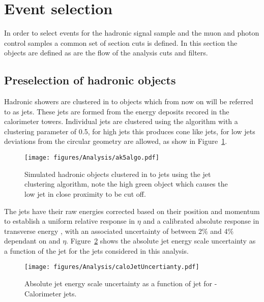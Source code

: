 
\section{Event selection} %
\label{sec:event_selection}
In order to select events for the hadronic signal sample and the muon and 
photon control samples a common set of section cuts is defined. In this section 
the objects are defined as are the flow of the analysis cuts and filters.

\subsection{Preselection of hadronic objects} %
\label{sub:Preselection_of_hadronic_objects}
Hadronic showers are clustered in to objects which from now on will be referred 
to as jets. These jets are formed from the energy deposits recored in the 
calorimeter towers. Individual jets are clustered using the \AK 
algorithm with a clustering parameter of 0.5\cite{Cacciari:2008ua}, for high \PT jets this produces cone like jets, for low \PT jets deviations from the circular geometry are allowed, as show in Figure~\ref{fig:figures_Analysis_ak5algo}.

\begin{figure}[htbp]
  \centering
    \texttt{[image: figures/Analysis/ak5algo.pdf]}
  \caption{Simulated hadronic objects clustered in to jets using the \AK jet 
  clustering algorithm, note the high \PT green object which causes the low \PT 
  jet in close proximity to be cut off.}
  \label{fig:figures_Analysis_ak5algo}
\end{figure}
The jets have their raw energies corrected based on their position and momentum 
to establish a uniform relative response in $\eta$ and a calibrated absolute 
response in transverse energy \ET, with an associated uncertainty of between 
2$\%$ and 4$\%$ dependant on \ET and $\eta$\cite{Chatrchyan:2011ds}. 
Figure~\ref{fig:figures_Analysis_caloJetUncertianty} shows the absolute jet 
energy scale uncertainty as a function of the jet \PT for the jets considered 
in this analysis.

\begin{figure}[htbp]
  \centering
    \texttt{[image: figures/Analysis/caloJetUncertianty.pdf]}
  \caption{Absolute jet energy scale uncertainty as a function of jet \PT for \AK-Calorimeter jets\cite{1748-0221-6-11-P11002}.}
  \label{fig:figures_Analysis_caloJetUncertianty}
\end{figure}

